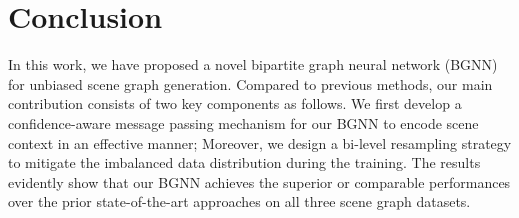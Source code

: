 \section{Conclusion}
In this work, we have proposed a novel bipartite graph neural network (BGNN) for unbiased scene graph generation. Compared to previous methods, our main contribution consists of two key components as follows. We first develop a confidence-aware message passing mechanism for our BGNN to encode scene context in an effective manner; Moreover, we design a bi-level resampling strategy to mitigate the imbalanced data distribution during the training.
The results evidently show that our BGNN achieves the superior or comparable performances over the prior state-of-the-art approaches on all three scene graph datasets.

